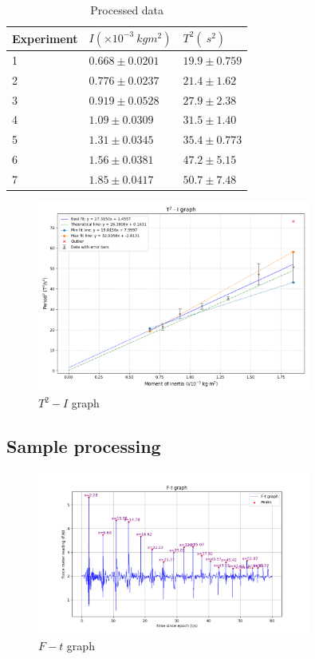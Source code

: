 \documentclass[a4paper]{article}
\begin{document}
\begin{table}[ht]
\centering
\caption{Processed data}
\label{tab.proc}
\begin{tabular}{lll}
\hline \hline
Experiment & $I(\times 10^{-3}\SI{}{kgm^2})$ & $T^2(\SI{}{s^2})$ \\ \hline
1          & $0.668\pm 0.0201$               & $19.9\pm0.759$    \\
2          & $0.776\pm 0.0237$               & $21.4\pm1.62$     \\
3          & $0.919\pm 0.0528$               & $27.9\pm2.38$     \\
4          & $1.09\pm 0.0309$                & $31.5\pm1.40$     \\
5          & $1.31\pm 0.0345$                & $35.4\pm0.773$    \\
6          & $1.56\pm 0.0381$                & $47.2\pm5.15$     \\
7          & $1.85\pm 0.0417$                & $50.7\pm7.48$     \\ \hline \hline
\end{tabular}
\end{table}

\begin{figure}[ht]
    \centering
    \includegraphics[width = 0.8\textwidth]{grapha.png}
    \caption{$T^2 - I$ graph}
    \label{fig.processedd}
\end{figure}

\subsection{Sample processing}

\begin{figure}
    \centering
    \includegraphics[width = 0.8\textwidth]{graphft.png}
    \caption{$F - t$ graph}
    \label{fig.ft}
\end{figure}
\end{document}
